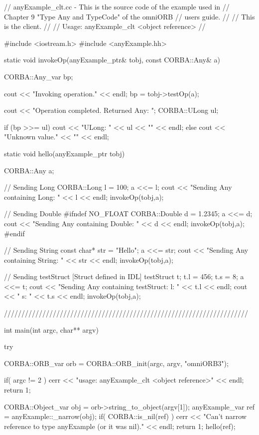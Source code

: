 \documentclass[11pt,twoside,a4paper]{book}
\begin{document}
\begin{cxxlisting}
// anyExample_clt.cc -  This is the source code of the example used in 
//                      Chapter 9 "Type Any and TypeCode" of the omniORB 
//                      users guide.
//
//                      This is the client.
//
// Usage: anyExample_clt <object reference>
//

#include <iostream.h>
#include <anyExample.hh>

static void invokeOp(anyExample_ptr& tobj, const CORBA::Any& a)
{
  CORBA::Any_var bp;

  cout << "Invoking operation." << endl;
  bp = tobj->testOp(a);

  cout << "Operation completed. Returned Any: ";
  CORBA::ULong ul;

  if (bp >>= ul) {
    cout << "ULong: " << ul << "\n" << endl;
  }
  else {
    cout << "Unknown value." << "\n" << endl;
  }
}

static void hello(anyExample_ptr tobj)
{
  CORBA::Any a;

  // Sending Long
  CORBA::Long l = 100;
  a <<= l;
  cout << "Sending Any containing Long: " << l << endl; 
  invokeOp(tobj,a);
    
  // Sending Double
#ifndef NO_FLOAT
  CORBA::Double d = 1.2345;
  a <<= d;
  cout << "Sending Any containing Double: " << d << endl; 
  invokeOp(tobj,a);
#endif
  
  // Sending String
  const char* str = "Hello";
  a <<= str;
  cout << "Sending Any containing String: " << str << endl;
  invokeOp(tobj,a);
    
  // Sending testStruct  [Struct defined in IDL]
  testStruct t;
  t.l = 456;
  t.s = 8;
  a <<= t;
  cout << "Sending Any containing testStruct: l: " << t.l << endl;
  cout << "                                   s: " << t.s << endl;
  invokeOp(tobj,a);
}

//////////////////////////////////////////////////////////////////////

int main(int argc, char** argv)
{
  try {
    CORBA::ORB_var orb = CORBA::ORB_init(argc, argv, "omniORB3");

    if( argc != 2 ) {
      cerr << "usage:  anyExample_clt <object reference>" << endl;
      return 1;
    }

    CORBA::Object_var obj = orb->string_to_object(argv[1]);
    anyExample_var ref = anyExample::_narrow(obj);
    if( CORBA::is_nil(ref) ) {
      cerr << "Can't narrow reference to type anyExample (or it was nil)."
	   << endl;
      return 1;
    }
    hello(ref);

}}
\end{cxxlisting}
\end{document}
